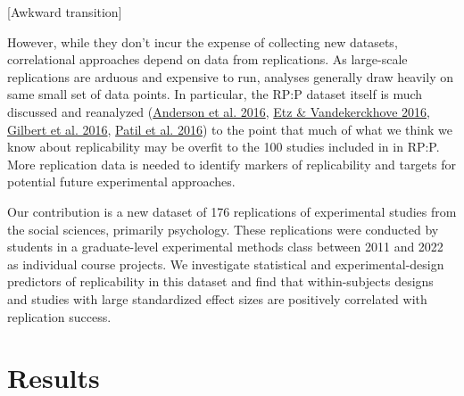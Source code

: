 \documentclass[
  english,
  a4paper,
]{article}
\begin{document}
{[}Awkward transition{]}

However, while they don't incur the expense of collecting new datasets, correlational approaches depend on data from replications. As large-scale replications are arduous and expensive to run, analyses generally draw heavily on same small set of data points. In particular, the RP:P dataset itself is much discussed and reanalyzed (\protect\hyperlink{ref-anderson2016}{Anderson et al. 2016}, \protect\hyperlink{ref-etz2016}{Etz \& Vandekerckhove 2016}, \protect\hyperlink{ref-gilbert2016}{Gilbert et al. 2016}, \protect\hyperlink{ref-patil2016}{Patil et al. 2016}) to the point that much of what we think we know about replicability may be overfit to the 100 studies included in in RP:P. More replication data is needed to identify markers of replicability and targets for potential future experimental approaches.

Our contribution is a new dataset of 176 replications of experimental studies from the social sciences, primarily psychology. These replications were conducted by students in a graduate-level experimental methods class between 2011 and 2022 as individual course projects. We investigate statistical and experimental-design predictors of replicability in this dataset and find that within-subjects designs and studies with large standardized effect sizes are positively correlated with replication success.

\hypertarget{results}{%
\section{Results}\label{results}}

    
\end{document}
